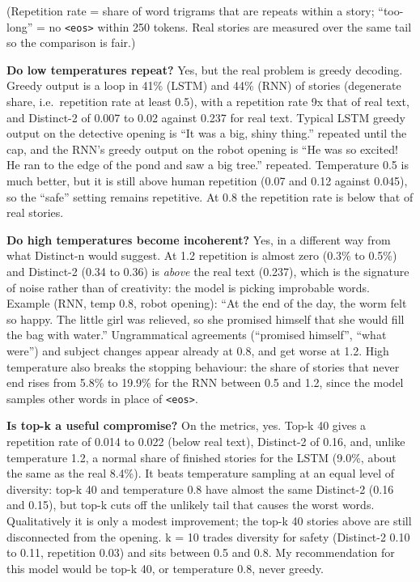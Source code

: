 \documentclass[10pt,a4paper]{article}
\begin{document}
(Repetition rate = share of word trigrams that are repeats within a story; ``too-long'' = no \texttt{\textless{}eos\textgreater{}} within 250 tokens.
Real stories are measured over the same tail so the comparison is fair.)

\textbf{Do low temperatures repeat?} Yes, but the real problem is greedy decoding. Greedy output is a loop in 41\% (LSTM) and
44\% (RNN) of stories (degenerate share, i.e.~repetition rate at least 0.5), with a repetition rate 9x that of real
text, and Distinct-2 of 0.007 to 0.02 against 0.237 for real text. Typical LSTM greedy output on the detective opening
is ``It was a big, shiny thing.'' repeated until the cap, and the RNN's greedy output on the robot opening is ``He was so
excited! He ran to the edge of the pond and saw a big tree.'' repeated. Temperature 0.5 is much better, but it is
still above human repetition (0.07 and 0.12 against 0.045), so the ``safe'' setting remains repetitive. At 0.8 the
repetition rate is below that of real stories.

\textbf{Do high temperatures become incoherent?} Yes, in a different way from what Distinct-n would suggest. At 1.2
repetition is almost zero (0.3\% to 0.5\%) and Distinct-2 (0.34 to 0.36) is \emph{above} the real text (0.237), which is
the signature of noise rather than of creativity: the model is picking improbable words. Example (RNN, temp 0.8, robot
opening): ``At the end of the day, the worm felt so happy. The little girl was relieved, so she promised himself that she
would fill the bag with water.'' Ungrammatical agreements (``promised himself'', ``what were'') and subject changes
appear already at 0.8, and get worse at 1.2. High temperature also breaks the stopping behaviour: the share of
stories that never end rises from 5.8\% to 19.9\% for the RNN between 0.5 and 1.2, since the model samples
other words in place of \texttt{\textless{}eos\textgreater{}}.

\textbf{Is top-k a useful compromise?} On the metrics, yes. Top-k 40 gives a repetition rate of 0.014 to 0.022 (below real text), Distinct-2 of
0.16, and, unlike temperature 1.2, a normal share of finished stories for the LSTM (9.0\%, about the same as the real 8.4\%). It beats temperature
sampling at an equal level of diversity: top-k 40 and temperature 0.8 have almost the same Distinct-2 (0.16 and 0.15), but top-k cuts off the
unlikely tail that causes the worst words. Qualitatively it is only a modest improvement; the top-k 40 stories above are still disconnected from
the opening. k = 10 trades diversity for safety (Distinct-2 0.10 to 0.11, repetition 0.03) and sits between 0.5 and 0.8.
My recommendation for this model would be top-k 40, or temperature 0.8, never greedy.
\end{document}
